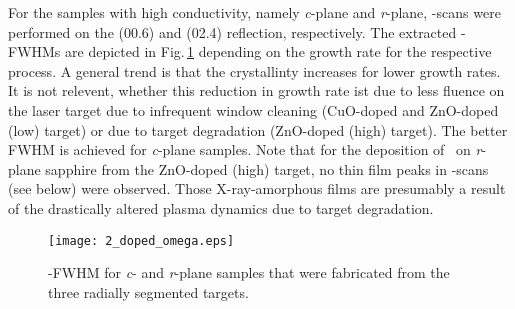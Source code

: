 For the samples with high conductivity, namely \textit{c}-plane and \textit{r}-plane, \textomega-scans were performed on the (00.6) and (02.4) reflection, respectively.
The extracted \textomega-FWHMs are depicted in Fig.\,\ref{Fig:Results_2_omega} depending on the growth rate for the respective process.
A general trend is that the crystallinty increases for lower growth rates.
It is not relevent, whether this reduction in growth rate ist due to less fluence on the laser target due to infrequent window cleaning (CuO-doped and ZnO-doped (low) target) or due to target degradation (ZnO-doped (high) target).
The better FWHM is achieved for \textit{c}-plane samples.
Note that for the deposition of \cro\ on \textit{r}-plane sapphire from the ZnO-doped (high) target, no thin film peaks in \thetaomega-scans (see below) were observed.
Those X-ray-amorphous films are presumably a result of the drastically altered plasma dynamics due to target degradation.
\begin{figure}
    \centering
    \texttt{[image: 2\_doped\_omega.eps]}
    \caption{\textomega-FWHM for \textit{c}- and \textit{r}-plane samples that were fabricated from the three radially segmented targets.}
    \label{Fig:Results_2_omega}
\end{figure}

